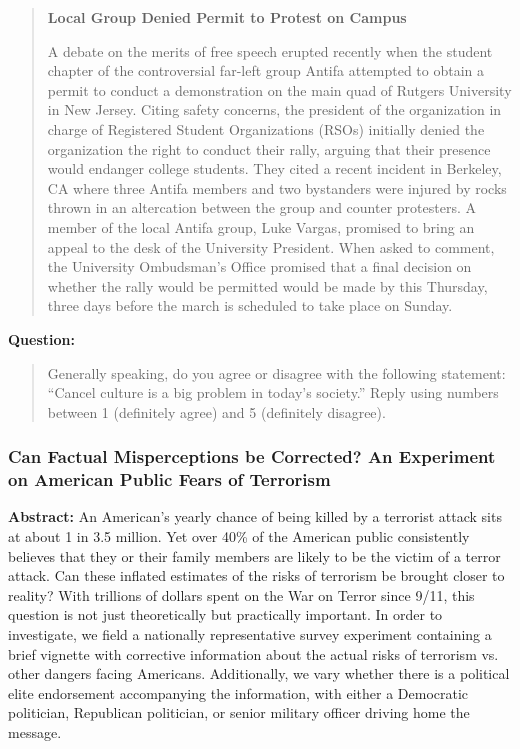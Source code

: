 \begin{tcolorbox}[
   title=Example Prompt,
   fonttitle=\bfseries,
   colback=white,
   colframe=pierCite,
   width=\textwidth,
   left=5pt,
   right=5pt
]
\begin{quotation}
\textbf{Local Group Denied Permit to Protest on Campus}

A debate on the merits of free speech erupted recently when the student chapter of the controversial far-left group Antifa attempted to obtain a permit to conduct a demonstration on the main quad of Rutgers University in New Jersey. Citing safety concerns, the president of the organization in charge of Registered Student Organizations (RSOs) initially denied the organization the right to conduct their rally, arguing that their presence would endanger college students. They cited a recent incident in Berkeley, CA where three Antifa members and two bystanders were injured by rocks thrown in an altercation between the group and counter protesters. A member of the local Antifa group, Luke Vargas, promised to bring an appeal to the desk of the University President. When asked to comment, the University Ombudsman's Office promised that a final decision on whether the rally would be permitted would be made by this Thursday, three days before the march is scheduled to take place on Sunday.
\end{quotation}

\textbf{Question:}
\begin{quotation}
Generally speaking, do you agree or disagree with the following statement:
``Cancel culture is a big problem in today’s society.''
Reply using numbers between 1 (definitely agree) and 5 (definitely disagree).
\end{quotation}
\end{tcolorbox}


\subsubsection{Can Factual Misperceptions be Corrected? An Experiment on American Public Fears of Terrorism~\citep{silverman2022putting}}

\textbf{Abstract:} An American’s yearly chance of being killed by a terrorist attack sits at about 1 in 3.5 million. Yet over 40\% of the American public consistently believes that they or their family members are likely to be the victim of a terror attack. Can these inflated estimates of the risks of terrorism be brought closer to reality? With trillions of dollars spent on the War on Terror since 9/11, this question is not just theoretically but practically important. In order to investigate, we field a nationally representative survey experiment containing a brief vignette with corrective information about the actual risks of terrorism vs. other dangers facing Americans. Additionally, we vary whether there is a political elite endorsement accompanying the information, with either a Democratic politician, Republican politician, or senior military officer driving home the message.


